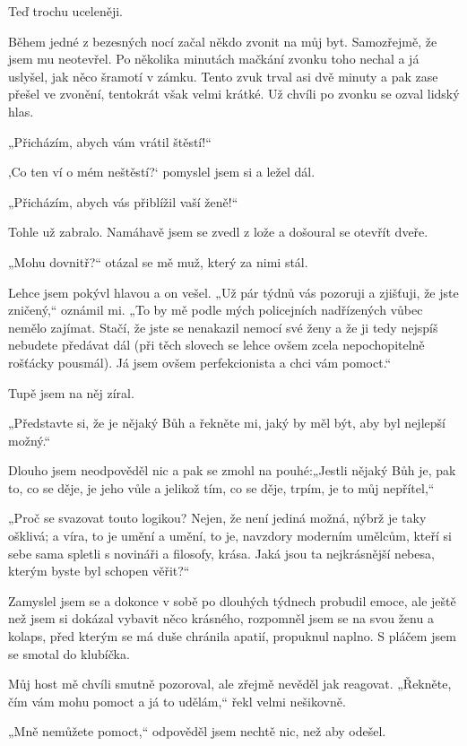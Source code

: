 Teď trochu uceleněji.

Během jedné z bezesných nocí začal někdo zvonit na můj byt. Samozřejmě, že jsem mu neotevřel. Po několika minutách mačkání zvonku toho nechal a já uslyšel, jak něco šramotí v zámku. Tento zvuk trval asi dvě minuty a pak zase přešel ve zvonění, tentokrát však velmi krátké. Už chvíli po zvonku se ozval lidský hlas.

„Přicházím, abych vám vrátil štěstí!“

‚Co ten ví o mém neštěstí?‘ pomyslel jsem si a ležel dál.

„Přicházím, abych vás přiblížil vaší ženě!“

Tohle už zabralo. Namáhavě jsem se zvedl z lože a došoural se otevřít dveře.

„Mohu dovnitř?“ otázal se mě muž, který za nimi stál.

Lehce jsem pokývl hlavou a on vešel. „Už pár týdnů vás pozoruji a zjišťuji, že jste zničený,“ oznámil mi. „To by mě podle mých policejních nadřízených vůbec nemělo zajímat. Stačí, že jste se nenakazil nemocí své ženy a že ji tedy nejspíš nebudete předávat dál (při těch slovech se lehce ovšem zcela nepochopitelně rošťácky pousmál). Já jsem ovšem perfekcionista a chci vám pomoct.“

Tupě jsem na něj zíral.

„Představte si, že je nějaký Bůh a řekněte mi, jaký by měl být, aby byl nejlepší možný.“

Dlouho jsem neodpověděl nic a pak se zmohl na pouhé:„Jestli nějaký Bůh je, pak to, co se děje, je jeho vůle a jelikož tím, co se děje, trpím, je to můj nepřítel,“ 

„Proč se svazovat touto logikou? Nejen, že není jediná možná, nýbrž je taky ošklivá; a víra, to je umění a umění, to je, navzdory moderním umělcům, kteří si sebe sama spletli s novináři a filosofy, krása. Jaká jsou ta nejkrásnější nebesa, kterým byste byl schopen věřit?“

Zamyslel jsem se a dokonce v sobě po dlouhých týdnech probudil emoce, ale ještě než jsem si dokázal vybavit něco krásného, rozpomněl jsem se na svou ženu a kolaps, před kterým se má duše chránila apatií, propuknul naplno. S pláčem jsem se smotal do klubíčka.

Můj host mě chvíli smutně pozoroval, ale zřejmě nevěděl jak reagovat. „Řekněte, čím vám mohu pomoct a já to udělám,“ řekl velmi nešikovně.

„Mně nemůžete pomoct,“ odpověděl jsem nechtě nic, než aby odešel.

